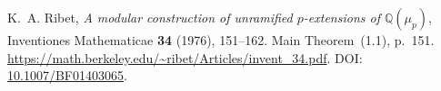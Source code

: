 K.~A. Ribet,
\emph{A modular construction of unramified $p$-extensions of
$\mathbb Q(\mu_p)$},
Inventiones Mathematicae \textbf{34} (1976), 151--162.
Main Theorem~(1.1), p.~151.
\url{https://math.berkeley.edu/~ribet/Articles/invent_34.pdf}.
DOI: \href{https://doi.org/10.1007/BF01403065}{10.1007/BF01403065}.
